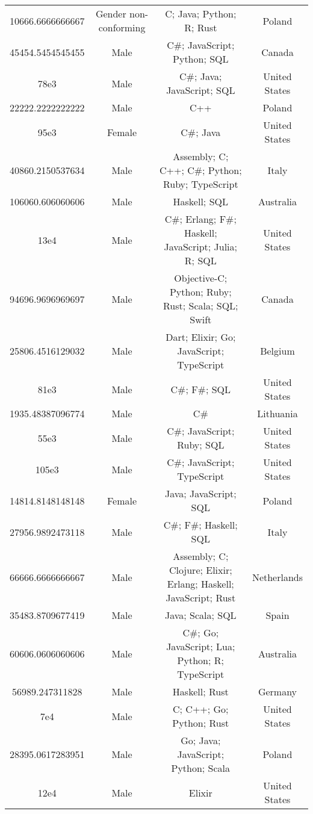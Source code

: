 \begin{center}
\begin{tabular}{ |c|c|c|c| }
10666.6666666667  &  Gender non-conforming  &  C; Java; Python; R; Rust  &  Poland  \\ 
45454.5454545455  &  Male  &  C\#; JavaScript; Python; SQL  &  Canada  \\ 
78e3  &  Male  &  C\#; Java; JavaScript; SQL  &  United States  \\ 
22222.2222222222  &  Male  &  C++  &  Poland  \\ 
95e3  &  Female  &  C\#; Java  &  United States  \\ 
40860.2150537634  &  Male  &  Assembly; C; C++; C\#; Python; Ruby; TypeScript  &  Italy  \\ 
106060.606060606  &  Male  &  Haskell; SQL  &  Australia  \\ 
13e4  &  Male  &  C\#; Erlang; F\#; Haskell; JavaScript; Julia; R; SQL  &  United States  \\ 
94696.9696969697  &  Male  &  Objective-C; Python; Ruby; Rust; Scala; SQL; Swift  &  Canada  \\ 
25806.4516129032  &  Male  &  Dart; Elixir; Go; JavaScript; TypeScript  &  Belgium  \\ 
81e3  &  Male  &  C\#; F\#; SQL  &  United States  \\ 
1935.48387096774  &  Male  &  C\#  &  Lithuania  \\ 
55e3  &  Male  &  C\#; JavaScript; Ruby; SQL  &  United States  \\ 
105e3  &  Male  &  C\#; JavaScript; TypeScript  &  United States  \\ 
14814.8148148148  &  Female  &  Java; JavaScript; SQL  &  Poland  \\ 
27956.9892473118  &  Male  &  C\#; F\#; Haskell; SQL  &  Italy  \\ 
66666.6666666667  &  Male  &  Assembly; C; Clojure; Elixir; Erlang; Haskell; JavaScript; Rust  &  Netherlands  \\ 
35483.8709677419  &  Male  &  Java; Scala; SQL  &  Spain  \\ 
60606.0606060606  &  Male  &  C\#; Go; JavaScript; Lua; Python; R; TypeScript  &  Australia  \\ 
56989.247311828  &  Male  &  Haskell; Rust  &  Germany  \\ 
7e4  &  Male  &  C; C++; Go; Python; Rust  &  United States  \\ 
28395.0617283951  &  Male  &  Go; Java; JavaScript; Python; Scala  &  Poland  \\ 
12e4  &  Male  &  Elixir  &  United States  \\ 

\end{tabular}
\end{center}
